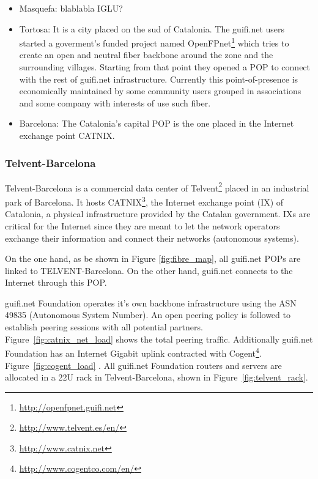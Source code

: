 \begin{itemize}
	\item Masquefa: blablabla IGLU?

	\item Tortosa: It is a city placed on the sud of Catalonia. The guifi.net users started a goverment's funded project named 
		OpenFPnet\footnote{\url{http://openfpnet.guifi.net}} which tries to create an open and neutral fiber backbone 
		around the zone and the surrounding villages. Starting from that point they opened a POP to connect with the 
		rest of guifi.net infrastructure. Currently this point-of-presence is economically maintained by some community 
		users grouped in associations and some company with interests of use such fiber.

	\item Barcelona: The Catalonia's capital POP is the one placed in the Internet exchange point CATNIX.
\end{itemize}

\FloatBarrier
\subsubsection{Telvent-Barcelona}

Telvent-Barcelona is a commercial data center of Telvent\footnote{\url{http://www.telvent.es/en/}} placed in an industrial park of Barcelona. It hosts CATNIX\footnote{\url{http://www.catnix.net}}, the Internet exchange point (IX) of Catalonia, a physical infrastructure provided by the Catalan government. IXs are critical for the Internet since they are meant to let the network operators exchange their information and connect their networks (autonomous systems). 

On the one hand, as be shown in Figure \ref{fig:fibre_map}, all guifi.net POPs are linked to TELVENT-Barcelona. On the other hand, guifi.net connects to the Internet through this POP.

guifi.net Foundation operates it's own backbone infrastructure using the ASN 49835 (Autonomous System Number). 
An open peering policy is followed to establish peering sessions with all potential partners. Figure~\ref{fig:catnix_net_load} shows the total peering traffic. Additionally guifi.net Foundation has an Internet Gigabit uplink contracted with Cogent\footnote{\url{http://www.cogentco.com/en/}}. Figure~\ref{fig:cogent_load} . All guifi.net Foundation routers and servers are allocated in a 22U rack in Telvent-Barcelona, shown in Figure~\ref{fig:telvent_rack}. 


